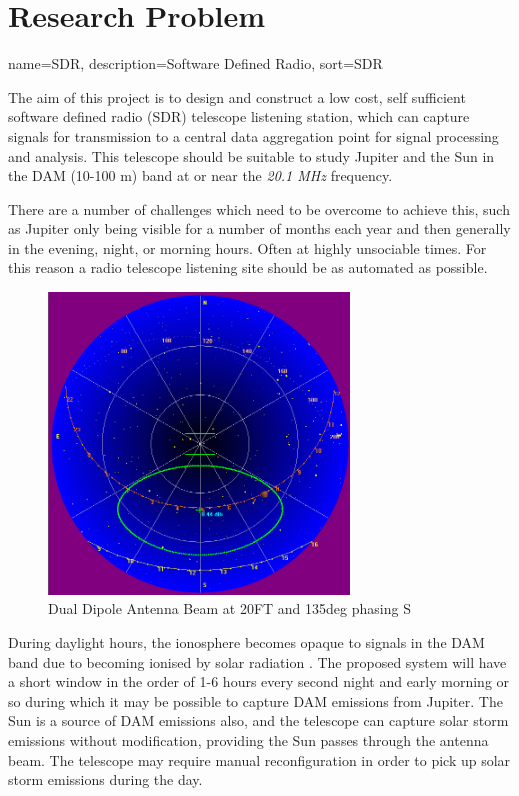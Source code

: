 \documentclass[runningheads,a4paper]{llncs}
\begin{document}
\section*{Research Problem}
%
{
  name={SDR},
  description={Software Defined Radio},
  sort=SDR
}

The aim of this project is to design and construct a low cost, self sufficient software defined radio (\gls{SDR}) telescope listening station, which can capture signals for transmission to a central data aggregation point for signal processing and analysis. This telescope should be suitable to study Jupiter and the Sun in the \gls{DAM} (10-100 m) band at or near the \textit{20.1 MHz} frequency.

There are a number of challenges which need to be overcome to achieve this, such as Jupiter only being visible for a number of months each year and then generally in the evening, night, or morning hours. Often at highly unsociable times. For this reason a radio telescope listening site should be as automated as possible.

%
\begin{figure}[here]
\centering
\includegraphics[width=8cm]{images/07}
\caption{Dual Dipole Antenna Beam at 20FT and 135deg phasing S \citep{nasa12}}
\label{fig:dual_dipole_20ft_135phasing_s}
\end{figure}
%

During daylight hours, the ionosphere becomes opaque to signals in the \gls{DAM} band due to becoming ionised by solar radiation \citep{nasa-ionosphere-12}. The proposed system will have a short window in the order of 1-6 hours every second night and early morning or so during which it may be possible to capture \gls{DAM} emissions from Jupiter. The Sun is a source of \gls{DAM} emissions also, and the telescope can capture solar storm emissions without modification, providing the Sun passes through the antenna beam. The telescope may require manual reconfiguration in order to pick up solar storm emissions during the day.
\end{document}

